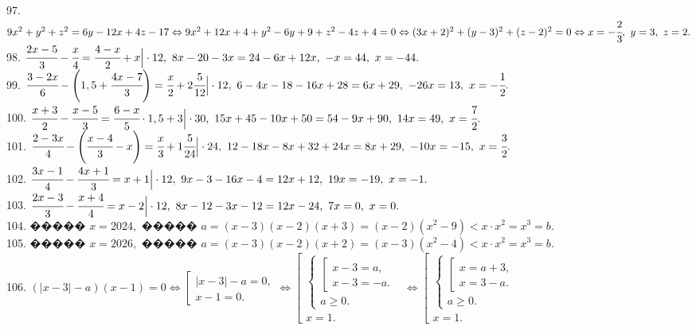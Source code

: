 \documentclass[12pt]{article}
\begin{document}
97. $9x^2+y^2+z^2=6y-12x+4z-17\Leftrightarrow9x^2+12x+4+y^2-6y+9+z^2-4z+4=0\Leftrightarrow(3x+2)^2+(y-3)^2+(z-2)^2=0\Leftrightarrow
x=-\cfrac{2}{3},\ y=3,\ z=2.$\\
98. $\cfrac{2x-5}{3}-\cfrac{x}{4}=\cfrac{4-x}{2}+x\Big|\cdot12,\ 8x-20-3x=24-6x+12x,\ -x=44,\ x=-44.$\\
99. $\cfrac{3-2x}{6}-\left(1,5+\cfrac{4x-7}{3}\right)=\cfrac{x}{2}+2\cfrac{5}{12}\Big|\cdot12,\ 6-4x-18-16x+28=6x+29,\ -26x=13,\ x=-\cfrac{1}{2}.$\\
100. $\cfrac{x+3}{2}-\cfrac{x-5}{3}=\cfrac{6-x}{5}\cdot1,5+3\Big|\cdot30,\ 15x+45-10x+50=54-9x+90,\ 14x=49,\ x=\cfrac{7}{2}.$\\
101. $\cfrac{2-3x}{4}-\left(\cfrac{x-4}{3}-x\right)=\cfrac{x}{3}+1\cfrac{5}{24}\Big|\cdot24,\ 12-18x-8x+32+24x=8x+29,\ -10x=-15,\ x=\cfrac{3}{2}.$\\
102. $\cfrac{3x-1}{4}-\cfrac{4x+1}{3}=x+1\Big|\cdot12,\ 9x-3-16x-4=12x+12,\ 19x=-19,\ x=-1.$\\
103. $\cfrac{2x-3}{3}-\cfrac{x+4}{4}=x-2\Big|\cdot12,\ 8x-12-3x-12=12x-24,\ 7x=0,\ x=0.$\\
104. ����� $x=2024,$ ����� $a=(x-3)(x-2)(x+3)=(x-2)(x^2-9)<x\cdot x^2=x^3=b.$\\
105. ����� $x=2026,$ ����� $a=(x-3)(x-2)(x+2)=(x-3)(x^2-4)<x\cdot x^2=x^3=b.$\\
106. $(|x-3|-a)(x-1)=0\Leftrightarrow \left[\begin{array}{l}|x-3|-a=0,\\ x-1=0.\end{array}\right.\Leftrightarrow
\left[\begin{array}{l}
\begin{cases}
\left[\begin{array}{l}
x-3=a,\\
x-3=-a.
\end{array}\right.\\
a\geqslant0.
\end{cases}\\
x=1.
\end{array}\right.\Leftrightarrow
\left[\begin{array}{l}
\begin{cases}
\left[\begin{array}{l}
x=a+3,\\
x=3-a.
\end{array}\right.\\
a\geqslant0.
\end{cases}\\
x=1.
\end{array}\right.$
\end{document}
